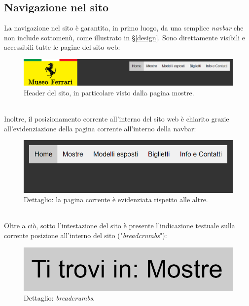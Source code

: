 \subsection{Navigazione nel sito}
La navigazione nel sito è garantita, in primo luogo, da una semplice \textit{navbar} che non include sottomenù, come illustrato in §\ref{design}. Sono direttamente visibili e accessibili tutte le pagine del sito web:
\begin{figure}[h]
		\begin{center}
		\includegraphics[scale=1.312]{Images/headerSito.png}
		\caption{Header del sito, in particolare visto dalla pagina mostre.}
	\end{center}
\end{figure}\\
Inoltre, il posizionamento corrente all'interno del sito web è chiarito grazie all'evidenziazione della pagina corrente all'interno della navbar:
\begin{figure}[h]
	\begin{center}
		\includegraphics[scale=1.312]{Images/selezionePaginaCorrente.png}
		\caption{Dettaglio: la pagina corrente è evidenziata rispetto alle altre.}
	\end{center}
\end{figure}\\
Oltre a ciò, sotto l'intestazione del sito è presente l'indicazione testuale sulla corrente posizione all'interno del sito ("\textit{breadcrumbs}"):
\begin{figure}[h]
	\begin{center}
		\includegraphics[scale=0.6]{Images/breadcrumbs.png}
		\caption{Dettaglio: \textit{breadcrumbs}.}
	\end{center}
\end{figure}\\
